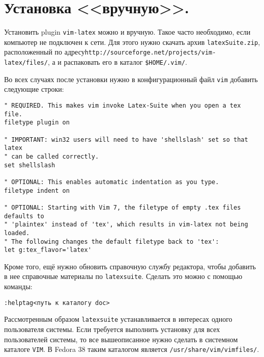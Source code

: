 \documentclass[a4paper]{article}
\begin{document}
\section{Установка <<вручную>>.}
Установить plugin \texttt{vim-latex} можно и вручную. Такое часто необходимо, 
если компьютер не подключен к сети. Для этого нужно скачать архив 
\texttt{latexSuite.zip}, расположенный по 
адресу\linebreak \texttt{http://sourceforge.net/projects/vim-latex/files/},
а и распаковать его в каталог \verb|$HOME/.vim/|. 

Во всех случаях после установки нужно в конфигурационный файл \texttt{vim}
добавить следующие строки:
\begin{verbatim}
" REQUIRED. This makes vim invoke Latex-Suite when you open a tex file.
filetype plugin on

" IMPORTANT: win32 users will need to have 'shellslash' set so that latex
" can be called correctly.
set shellslash

" OPTIONAL: This enables automatic indentation as you type.
filetype indent on

" OPTIONAL: Starting with Vim 7, the filetype of empty .tex files defaults to
" 'plaintex' instead of 'tex', which results in vim-latex not being loaded.
" The following changes the default filetype back to 'tex':
let g:tex_flavor='latex'
\end{verbatim}

Кроме того, ещё нужно обновить справочную службу редактора, чтобы добавить
в нее справочные материалы по \texttt{latexsuite}. Сделать это можно с помощью
команды:
\begin{verbatim}
:helptag<путь к каталогу doc>
\end{verbatim}

Рассмотренным образом \texttt{latexsuite} устанавливается в интересах одного пользователя системы.
Если требуется выполнить установку для всех пользователей системы, то все вышеописанное нужно 
сделать в системном каталоге \texttt{VIM}. В Fedora 38 таким каталогом является
\texttt{/usr/share/vim/vimfiles/}. 
\end{document}
